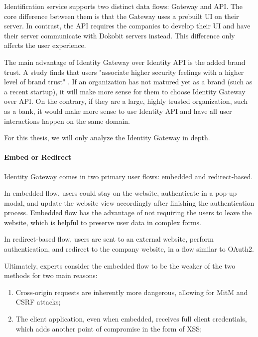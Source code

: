 Identification service supports two distinct data flows: Gateway and API. The core difference between them is that the Gateway uses a prebuilt UI on their server. In contrast, the API requires the companies to develop their UI and have their server communicate with Dokobit servers instead. This difference only affects the user experience.

The main advantage of Identity Gateway over Identity API is the added brand trust. A study finds that users "associate higher security feelings with a higher level of brand trust" \cite{ha2004factors}. If an organization has not matured yet as a brand (such as a recent startup), it will make more sense for them to choose Identity Gateway over API. On the contrary, if they are a large, highly trusted organization, such as a bank, it would make more sense to use Identity API and have all user interactions happen on the same domain.

For this thesis, we will only analyze the Identity Gateway in depth.

\paragraph{Embed or Redirect}

Identity Gateway comes in two primary user flows: embedded and redirect-based.

In embedded flow, users could stay on the website, authenticate in a pop-up modal, and update the website view accordingly after finishing the authentication process. Embedded flow has the advantage of not requiring the users to leave the website, which is helpful to preserve user data in complex forms.

In redirect-based flow, users are sent to an external website, perform authentication, and redirect to the company website, in a flow similar to OAuth2.

Ultimately, experts consider the embedded flow to be the weaker of the two methods \cite{auth0-universal-vs-embedded} for two main reasons:

\begin{enumerate}
  \item Cross-origin requests are inherently more dangerous, allowing for MitM and CSRF attacks;
  \item The client application, even when embedded, receives full client credentials, which adds another point of compromise in the form of XSS;
\end{enumerate}

